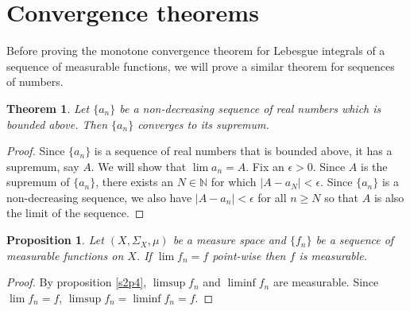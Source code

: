 \documentclass{article}
\newcommand{\son}{\mathbb{N}}
\theoremstyle{plain}
\newtheorem{thm}{Theorem}
\numberwithin{thm}{section}
\theoremstyle{plain}
\newtheorem{prop}{Proposition}
\numberwithin{prop}{section}
\theoremstyle{definition}
\numberwithin{defn}{section}
\theoremstyle{remark}
\theoremstyle{plain}
\numberwithin{cor}{section}
\numberwithin{equation}{section}
\begin{document}
\section{Convergence theorems}\label{c4}
Before proving the monotone convergence theorem for Lebesgue integrals of a
sequence of measurable functions, we will prove a similar theorem for sequences
of numbers.
\begin{thm}\label{c4t1}
Let $\{a_n\}$ be a non-decreasing sequence of real numbers which is bounded 
above. Then $\{a_n\}$ converges to its supremum.
\end{thm}
\begin{proof}
Since $\{a_n\}$ is a sequence of real numbers that is bounded above, it has a
supremum, say $A$. We will show that $\lim a_n = A$. Fix an $\epsilon > 0$.
Since $A$ is the supremum of $\{a_n\}$, there exists an $N \in \son$ for which
$|A - a_N| < \epsilon$. Since $\{a_n\}$ is a non-decreasing sequence, we also
have $|A - a_n| < \epsilon$ for all $n \ge N$ so that $A$ is also the limit of
the sequence.
\end{proof}

\begin{prop}\label{c4p1}
Let $(X, \Sigma_X, \mu)$ be a measure space and $\{f_n\}$ be a sequence of
measurable functions on $X$. If $\lim f_n = f$ point-wise then $f$ is
measurable.
\end{prop}
\begin{proof}
By proposition \ref{s2p4}, $\limsup f_n$ and $\liminf f_n$ are measurable.
Since $\lim f_n = f$, $\limsup f_n = \liminf f_n = f$.
\end{proof}
\end{document}
